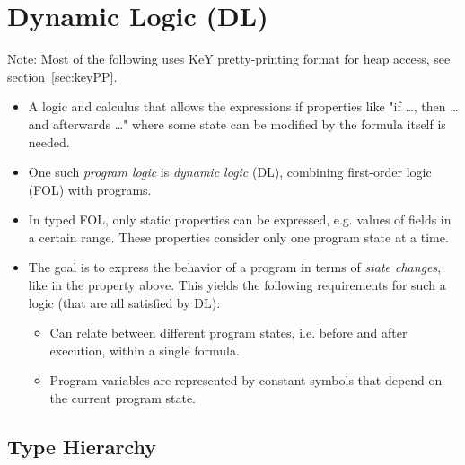 \chapter{Dynamic Logic (DL)}
	\label{c:dl}
	
	Note: Most of the following uses KeY pretty-printing format for heap access, see section~\ref{sec:keyPP}.
	
	\begin{itemize}
		\item A logic and calculus that allows the expressions if properties like "if \dots, then \dots and afterwards \dots" where some state can be modified by the formula itself is needed.
		\item One such \textit{program logic} is \textit{dynamic logic} (DL), combining first-order logic (FOL) with programs.
		\item In typed FOL, only static properties can be expressed, e.g. values of fields in a certain range. These properties consider only one program state at a time.
		\item The goal is to express the behavior of a program in terms of \textit{state changes}, like in the property above. This yields the following requirements for such a logic (that are all satisfied by DL):
			\begin{itemize}
				\item Can relate between different program states, i.e. before and after execution, within a single formula.
				\item Program variables are represented by constant symbols that depend on the current program state.
			\end{itemize}
	\end{itemize}

	\section{Type Hierarchy}
	
